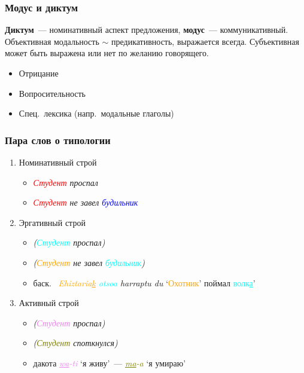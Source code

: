 \begin{frame}
  \frametitle{Модус и диктум}

  \textbf{Диктум}~--- номинативный аспект предложения, \textbf{модус}~--- коммуникативный.
  Объективная модальность $\sim$ предикативность, выражается всегда.
  Субъективная может быть выражена или нет по желанию говорящего.

  \vfill

  \begin{itemize}
    \item Отрицание
    \item Вопросительность
    \item Спец.\ лексика (напр.\ модальные глаголы)
  \end{itemize}
\end{frame}

\begin{frame}
  \frametitle{Пара слов о типологии}

  \begin{enumerate}
    \item Номинативный строй \begin{itemize}
      \item \textit{\textcolor{red}{Студент} проспал}
      \item \textit{\textcolor{red}{Студент} не завел \textcolor{blue}{будильник}}
    \end{itemize}

    \item<2-> Эргативный строй \begin{itemize}
      \item \textit{
        (\textcolor{cyan}{Студент} {\normalfont [фактитив]} проспал)
      }
      \item \textit{
        (\textcolor{orange}{Студент} {\normalfont [агентив]} не завел \textcolor{cyan}{будильник})
      }
      \item<3-> баск.\ \textit{
        \textcolor{orange}{Ehiztaria\underline{k}} \textcolor{cyan}{otsoa} harraptu du
      }
      `\textcolor{orange}{Охотник}' поймал \textcolor{cyan}{волк\underline{а}}'
    \end{itemize}

    \item<4-> Активный строй \begin{itemize}
      \item \textit{(\textcolor{violet}{Студент} {\normalfont [актив]} проспал)}
      \item \textit{(\textcolor{olive}{Студент} {\normalfont [статив]} споткнулся)}
      \item<5-> дакота \textit{\textcolor{violet}{\underline{wa}-ti}} `я живу'~---
                \textit{\textcolor{olive}{\underline{ma}-a}} `я умираю'
    \end{itemize}
  \end{enumerate}
\end{frame}
